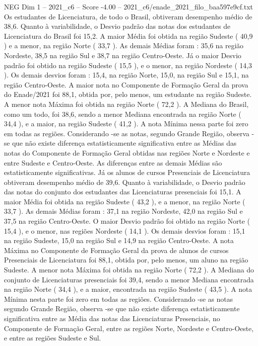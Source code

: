 \begin{textsample}{NEG Dim 1 – 2021\_c6 – Score -4.00 – 2021\_c6/enade\_2021\_filo\_baa597e9cf.txt}
Os estudantes de Licenciatura, de todo o Brasil, obtiveram desempenho médio de 38,6.
Quanto à variabilidade, o Desvio padrão das notas dos estudantes de Licenciatura do Brasil foi 15,2.
A maior Média foi obtida na região Sudeste ( 40,9 ) e a menor, na região Norte ( 33,7 ).
As demais Médias foram : 35,6 na região Nordeste, 38,5 na região Sul e 38,7 na região Centro-Oeste.
Já o maior Desvio padrão foi obtido na região Sudeste ( 15,5 ), e o menor, na região Nordeste ( 14,3 ).
Os demais desvios foram : 15,4, na região Norte, 15,0, na região Sul e 15,1, na região Centro-Oeste.
A maior nota no Componente de Formação Geral da prova do Enade/2021 foi 88,1, obtida por, pelo menos, um estudante na região Sudeste.
A menor nota Máxima foi obtida na região Norte ( 72,2 ).
A Mediana do Brasil, como um todo, foi 38,6, sendo a menor Mediana encontrada na região Norte ( 34,4 ), e a maior, na região Sudeste ( 41,2 ).
A nota Mínima nessa parte foi zero em todas as regiões.
Considerando -se as notas, segundo Grande Região, observa -se que não existe diferença estatisticamente significativa entre as Médias das notas do Componente de Formação Geral obtidas nas regiões Norte e Nordeste e entre Sudeste e Centro-Oeste.
As diferenças entre as demais Médias são estatisticamente significativas.
Já os alunos de cursos Presenciais de Licenciatura obtiveram desempenho médio de 39,6.
Quanto à variabilidade, o Desvio padrão das notas do conjunto dos estudantes das Licenciaturas presenciais foi 15,1.
A maior Média foi obtida na região Sudeste ( 43,2 ), e a menor, na região Norte ( 33,7 ).
As demais Médias foram : 37,1 na região Nordeste, 42,0 na região Sul e 37,5 na região Centro-Oeste.
O maior Desvio padrão foi obtido na região Norte ( 15,4 ), e o menor, nas regiões Nordeste ( 14,1 ).
Os demais desvios foram : 15,1 na região Sudeste, 15,0 na região Sul e 14,9 na região Centro-Oeste.
A nota Máxima no Componente de Formação Geral da prova de alunos de cursos Presenciais de Licenciatura foi 88,1, obtida por, pelo menos, um aluno na região Sudeste.
A menor nota Máxima foi obtida na região Norte ( 72,2 ).
A Mediana do conjunto de Licenciaturas presenciais foi 39,4, sendo a menor Mediana encontrada na região Norte ( 34,4 ), e a maior, encontrada na região Sudeste ( 43,5 ).
A nota Mínima nesta parte foi zero em todas as regiões.
Considerando -se as notas segundo Grande Região, observa -se que não existe diferença estatisticamente significativa entre as Média das notas das Licenciaturas Presenciais, no Componente de Formação Geral, entre as regiões Norte, Nordeste e Centro-Oeste, e entre as regiões Sudeste e Sul.

\end{textsample}
